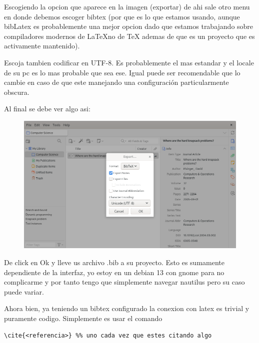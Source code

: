 \documentclass[12pt]{exam}
\begin{document}
Escogiendo la opcion que aparece en la imagen (exportar) de ahi sale otro menu en donde debemos escoger bibtex (por que es lo que estamos usando, aunque bibLatex es probablemente una mejor opcion dado que estamos trabajando sobre compiladores modernos de \LaTeX no de \TeX{} ademas de que es un proyecto que es activamente mantenido).

Escoja tambien codificar en UTF-8. Es probablemente el mas estandar y el locale de su pc es lo mas probable que sea ese. Igual puede ser recomendable que lo cambie en caso de que este manejando una configuración particularmente obscura. 

Al final se debe ver algo asi:

\begin{figure}[H]
    \centering
    \includegraphics[width=0.8\linewidth]{Figures/section_4_a_p2.png}
    \label{fig:sec_4_a_p2}
\end{figure}

De click en Ok y lleve us archivo .bib a su proyecto. Esto es sumamente dependiente de la interfaz, yo estoy en un debian 13 con gnome para no complicarme y por tanto tengo que simplemente navegar nautilus pero su caso puede variar. 

Ahora bien, ya teniendo un bibtex configurado la conexion con latex es trivial y puramente codigo. Simplemente es usar el comando

\begin{verbatim}
\cite{<referencia>} %% uno cada vez que estes citando algo




\end{verbatim}

\subsection{}
\end{document}
